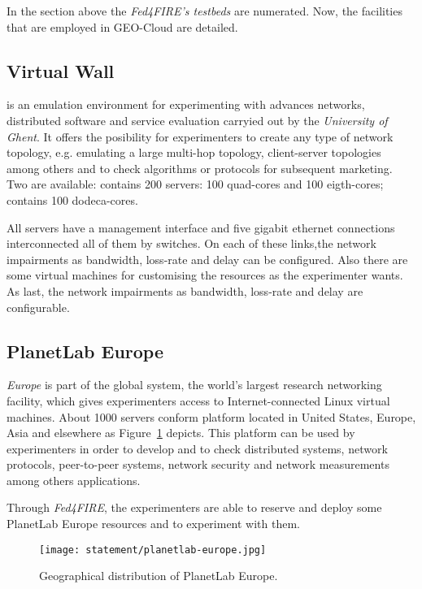 In the section above the \emph{Fed4FIRE's testbeds} are numerated. Now, the
facilities that are employed in GEO-Cloud are detailed.

\subsection{Virtual Wall}

\vw is an emulation environment for
experimenting with advances networks, distributed software and service
evaluation carryied out by the \emph{University of Ghent}. It offers the posibility for experimenters to create any type of
network topology, e.g. emulating a large multi-hop topology, client-server
topologies among others and to check algorithms or protocols for subsequent
marketing. 
Two \vw are available:  contains 200 servers: 100
quad-cores and 100 eigth-cores;  contains 100 dodeca-cores. 

All servers have a management interface and five gigabit ethernet connections
interconnected all of them by switches. On each of these links,the network
impairments as bandwidth, loss-rate and delay can be configured. Also there are some virtual machines for
customising the resources as the experimenter wants. As last, the network
impairments as bandwidth, loss-rate and delay are configurable.  

\subsection{PlanetLab Europe}

\pl \emph{Europe} is part of the \pl global system, the world's largest
research networking facility, which gives experimenters access to
Internet-connected Linux virtual machines. About 1000 servers conform \pl
platform located in United States, Europe, Asia and elsewhere as Figure~\ref{fig:intr-planetlab-europe} depicts. 
This platform can be used by experimenters in order to develop and to check
distributed systems, network protocols, peer-to-peer systems, network security
and network measurements among others applications.

Through \emph{Fed4FIRE}, the experimenters are able to reserve and deploy some
PlanetLab Europe resources and to experiment with them.

\begin{figure}[!h]
\begin{center}
\texttt{[image: statement/planetlab-europe.jpg]}
\caption{Geographical distribution of PlanetLab Europe.}
\label{fig:intr-planetlab-europe}
\end{center}
\end{figure}

